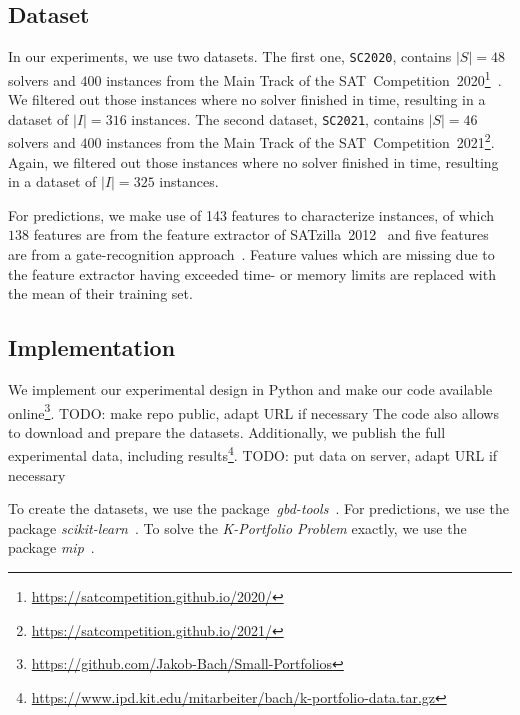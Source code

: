 \documentclass[conference]{IEEEtran}
\newcommand{\todo}[1]{{\color{red}TODO: #1}}
\begin{document}
\subsection{Dataset}

In our experiments, we use two datasets.
The first one, \texttt{SC2020}, contains $|S| = 48$ solvers and $400$ instances from the Main Track of the SAT~Competition~2020\footnote{\url{https://satcompetition.github.io/2020/}}~\cite{balyo2020proceedings, SC2020:AIJ}.
We filtered out those instances where no solver finished in time, resulting in a dataset of $|I| = 316$ instances. 
The second dataset, \texttt{SC2021}, contains $|S| = 46$ solvers and $400$ instances from the Main Track of the SAT~Competition~2021\footnote{\url{https://satcompetition.github.io/2021/}}.
Again, we filtered out those instances where no solver finished in time, resulting in a dataset of $|I| = 325$ instances.

For predictions, we make use of 143 features to characterize instances, of which 
$138$ features are from the feature extractor of SATzilla~2012~\cite{xu2008satzilla, xu2012satzilla2012} and five features are from a gate-recognition approach~\cite{Iser:2015:GateRecognition}. 
Feature values which are missing due to the feature extractor having exceeded time- or memory limits are replaced with the mean of their training set. %

\subsection{Implementation}

We implement our experimental design in Python and make our code available online\footnote{\url{https://github.com/Jakob-Bach/Small-Portfolios}}.
\todo{make repo public, adapt URL if necessary}
The code also allows to download and prepare the datasets.
Additionally, we publish the full experimental data, including results\footnote{\url{https://www.ipd.kit.edu/mitarbeiter/bach/k-portfolio-data.tar.gz}}.
\todo{put data on server, adapt URL if necessary}

To create the datasets, we use the package~\emph{gbd-tools}~\cite{iser2020collaborative}.
For predictions, we use the package \emph{scikit-learn}~\cite{scikit-learn}.
To solve the \emph{K-Portfolio Problem} exactly, we use the package \emph{mip}~\cite{python-mip}.
\end{document}
